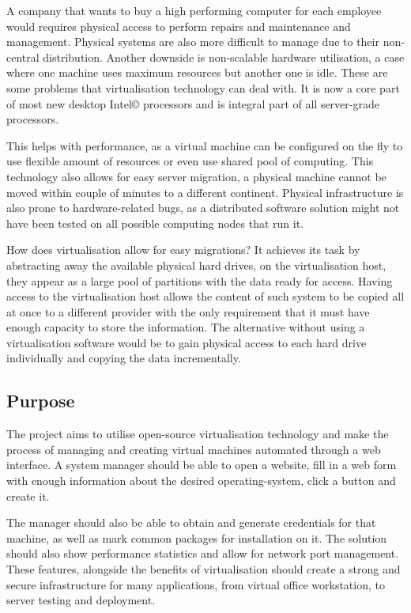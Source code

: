 \documentclass{article}
\begin{document}
A company that wants to buy a high performing computer for each employee would requires physical access to perform repairs and maintenance and management. Physical systems are also more difficult to manage due to their non-central distribution. Another downside is non-scalable hardware utilisation, a case where one machine uses maximum resources but another one is idle. These are some problems that virtualisation technology can deal with.  It is now a core part of most new desktop Intel© processors and is integral part of all server-grade processors.

This helps with performance, as a virtual machine can be configured on the fly to use flexible amount of resources or even use shared pool of computing. This technology also allows for easy server migration, a physical machine cannot be moved within couple of minutes to a different continent. Physical infrastructure is also prone to hardware-related bugs, as a distributed software solution might not have been tested on all possible computing nodes that run it.

How does virtualisation allow for easy migrations? It achieves its task by abstracting away the available physical hard drives, on the virtualisation host, they appear as a large pool of partitions with the data ready for access. Having access to the virtualisation host allows the content of such system to be copied all at once to a different provider with the only requirement that it must have enough capacity to store the information. The alternative without using a virtualisation software would be to gain physical access to each hard drive individually and copying the data incrementally.

\subsection{Purpose}
The project aims to utilise open-source virtualisation technology and make the process of managing and creating virtual machines automated through a web interface. A system manager should be able to open a website, fill in a web form with enough information about the desired \gls{operating-system}, click a button and create it.

The manager should also be able to obtain and generate credentials for that machine, as well as mark common packages for installation on it. The solution should also show performance statistics and allow for network port management. These features, alongside the benefits of virtualisation should create a strong and secure infrastructure for many applications, from virtual office workstation, to server testing and deployment.
\end{document}
